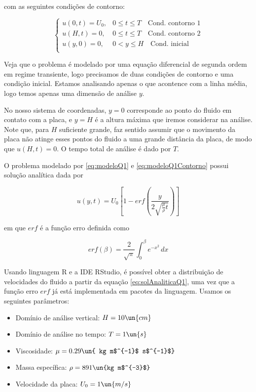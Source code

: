 \noindent com as seguintes condições de contorno:

\begin{equation}\label{eq:modeloQ1Contorno}
    \begin{cases}
        u(0, t) = U_0, & 0 \leq t \leq T \quad \textrm{Cond. contorno 1}\\
        u(H, t) = 0,   & 0 \leq t \leq T \quad \textrm{Cond. contorno 2}\\
        u(y, 0) =  0,  & 0 < y \leq H \quad \textrm{Cond. inicial}     \\
    \end{cases}
\end{equation}

Veja que o problema é modelado por uma equação diferencial de segunda ordem
em regime transiente, logo precisamos de duas condições de contorno e uma condição
inicial. Estamos analisando apenas o que acontence com a linha média, logo temos 
apenas uma dimensão de análise $y$.

No nosso sistema de coordenadas, $y = 0$ corresponde ao ponto do fluido
em contato com a placa, e $y = H$ é a altura máxima que iremos considerar na análise.
Note que, para $H$ suficiente grande, faz sentido assumir que o movimento da placa
não atinge esses pontos do fluido a uma grande distância da placa, de modo que
$u(H, t) = 0$. O tempo total de análise é dado por $T$.

O problema modelado por \eqref{eq:modeloQ1} e \eqref{eq:modeloQ1Contorno} possui solução analítica dada por

\begin{equation}\label{eq:solAnaliticaQ1}
    u(y,t) = U_0 \left[1 - erf\left(\frac{y}{2\sqrt{\frac{\mu}{\rho}t}}\right)\right]
\end{equation}

\noindent em que $erf$ é a função erro definida como

\begin{equation}\label{eq:erf}
    erf(\beta) = \frac{2}{\sqrt{\pi}} \int_0^\beta e^{-x^2} \, dx
\end{equation}

Usando linguagem R e a IDE RStudio,
é possível obter a distribuição de velocidades do fluido
a partir da equação \eqref{eq:solAnaliticaQ1}, uma vez que a função erro $erf$
já está implementada em pacotes da linguagem. Usamos os seguintes parâmetros:

\begin{itemize}
    \item Domínio de análise vertical: $H=10 \un{cm}$
    \item Domínio de análise no tempo: $T=1 \un{s}$
    \item Viscosidade: $\mu=0.29 \un{ kg m$^{-1}$ s$^{-1}$}$
    \item Massa específica: $\rho=891 \un{kg m$^{-3}$}$
    \item Velocidade da placa: $U_0 = 1 \un{m/s}$
\end{itemize}

